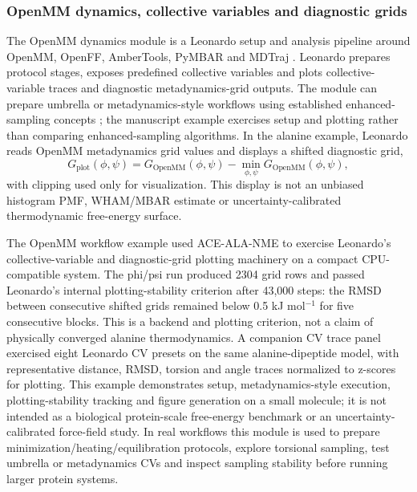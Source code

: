 \documentclass[pdflatex,sn-vancouver-num]{sn-jnl}
\begin{document}
\subsubsection{OpenMM dynamics, collective variables and diagnostic grids}

The OpenMM dynamics module is a Leonardo setup and analysis pipeline around OpenMM, OpenFF, AmberTools, PyMBAR and MDTraj \cite{openmm2017,openff2018,ambertools,mbar2008,mdtraj2015}.  Leonardo prepares protocol stages, exposes predefined collective variables and plots collective-variable traces and diagnostic metadynamics-grid outputs.  The module can prepare umbrella or metadynamics-style workflows using established enhanced-sampling concepts \cite{torrie_umbrella1977,kumar_wham1992,laio_metadynamics2002}; the manuscript example exercises setup and plotting rather than comparing enhanced-sampling algorithms.  In the alanine example, Leonardo reads OpenMM metadynamics grid values and displays a shifted diagnostic grid,
\begin{equation}
G_\mathrm{plot}(\phi,\psi)=G_\mathrm{OpenMM}(\phi,\psi)-\min_{\phi,\psi}G_\mathrm{OpenMM}(\phi,\psi),
\end{equation}
with clipping used only for visualization.  This display is not an unbiased histogram PMF, WHAM/MBAR estimate or uncertainty-calibrated thermodynamic free-energy surface.

The OpenMM workflow example used ACE-ALA-NME to exercise Leonardo's collective-variable and diagnostic-grid plotting machinery on a compact CPU-compatible system.  The phi/psi run produced 2304 grid rows and passed Leonardo's internal plotting-stability criterion after 43,000 steps: the RMSD between consecutive shifted grids remained below 0.5 kJ mol$^{-1}$ for five consecutive blocks.  This is a backend and plotting criterion, not a claim of physically converged alanine thermodynamics.  A companion CV trace panel exercised eight Leonardo CV presets on the same alanine-dipeptide model, with representative distance, RMSD, torsion and angle traces normalized to z-scores for plotting.  This example demonstrates setup, metadynamics-style execution, plotting-stability tracking and figure generation on a small molecule; it is not intended as a biological protein-scale free-energy benchmark or an uncertainty-calibrated force-field study.  In real workflows this module is used to prepare minimization/heating/equilibration protocols, explore torsional sampling, test umbrella or metadynamics CVs and inspect sampling stability before running larger protein systems.
\end{document}
